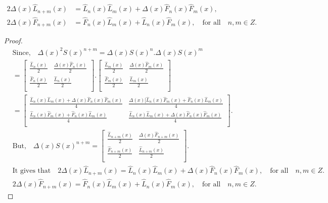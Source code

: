 \begin{lemma}
\begin{align*}
2\Delta(x) \widehat{L}_{n+m}(x)&= \widehat{L}_{n}(x) \widehat{L}_{m}(x)+\Delta(x)  \widehat{F}_{n}(x) \widehat{F}_{m}(x),\\
2\Delta(x) \widehat{F}_{n+m}(x)&= \widehat{F}_{n}(x) \widehat{L}_{m}(x)+ \widehat{L}_{n}(x) \widehat{F}_{m}(x),\quad \text{for all}\quad n, m\in Z.
\end{align*}
\end{lemma}
\begin{proof}
\begin{align*}
&\text{Since,} \quad \Delta(x)^2 S(x)^{n+m}=\Delta(x) S(x)^n.\Delta(x) S(x)^m\\
&={\left[
\begin{array}{cc}
    \frac{ \widehat{L}_{n}(x)}{2} & \frac{\Delta(x)  \widehat{F}_{n}(x)}{2} \\
    \frac{ \widehat{F}_{n}(x)}{2} & \frac{ \widehat{L}_{n}(x)}{2} \\
	\end{array}
	\right]}.{\left[
 \begin{array}{cc}
    \frac{ \widehat{L}_{m}(x)}{2} & \frac{\Delta(x)  \widehat{F}_{m}(x)}{2} \\
    \frac{ \widehat{F}_{m}(x)}{2} & \frac{ \widehat{L}_{m}(x)}{2} \\
	\end{array}
	\right]}\\
	&={\left[
 \begin{array}{cc}
    \frac{ \widehat{L}_{n}(x) \widehat{L}_{m}(x)+\Delta(x)  \widehat{F}_{n}(x) \widehat{F}_{m}(x)}{4} & \frac{\Delta(x)[ \widehat{L}_{n}(x) \widehat{F}_{m}(x)+ \widehat{F}_{n}(x) \widehat{L}_{m}(x)}{4} \\
    \frac{ \widehat{L}_{n}(x) \widehat{F}_{m}(x)+ \widehat{F}_{n}(x) \widehat{L}_{m}(x)}{4} & \frac{ \widehat{L}_{n}(x) \widehat{L}_{m}(x)+\Delta(x)  \widehat{F}_{n}(x) \widehat{F}_{m}(x)}{4} \\
	\end{array}
	\right]}.\\
&\text{But,} \quad 	\Delta(x) S(x)^{n+m}={\left[
 \begin{array}{cc}
    \frac{\widehat{L}_{n+m}(x)}{2} & \frac{\Delta(x) \widehat{F}_{n+m}(x)}{2} \\
    \frac{\widehat{F}_{n+m}(x)}{2} & \frac{\widehat{L}_{n+m}(x)}{2} \\
	\end{array}
	\right]}.\\
	&\text{It gives that} \quad 	2\Delta(x) \widehat{L}_{n+m}(x)= \widehat{L}_{n}(x) \widehat{L}_{m}(x)+\Delta(x)  \widehat{F}_{n}(x) \widehat{F}_{m}(x),\quad \text{for all}\quad n, m\in Z.\\
&2\Delta(x) \widehat{F}_{n+m}(x)= \widehat{F}_{n}(x) \widehat{L}_{m}(x)+ \widehat{L}_{n}(x) \widehat{F}_{m}(x),\quad \text{for all}\quad n, m\in Z.
\end{align*}		
\end{proof}
